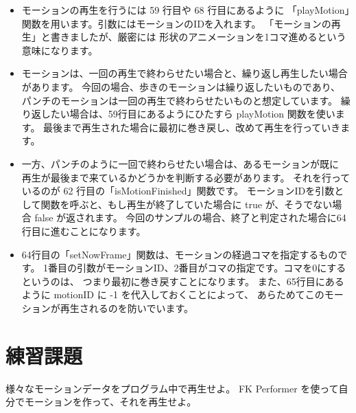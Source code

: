 \begin{itemize}
 \item モーションの再生を行うには 59 行目や 68 行目にあるように
	「playMotion」関数を用います。引数にはモーションのIDを入れます。
	「モーションの再生」と書きましたが、厳密には
	形状のアニメーションを1コマ進めるという意味になります。

 \item モーションは、一回の再生で終わらせたい場合と、繰り返し再生したい場合があります。
	今回の場合、歩きのモーションは繰り返したいものであり、
	パンチのモーションは一回の再生で終わらせたいものと想定しています。
	繰り返したい場合は、59行目にあるようにひたすら playMotion 関数を使います。
	最後まで再生された場合に最初に巻き戻し、改めて再生を行っていきます。

 \item 一方、パンチのように一回で終わらせたい場合は、あるモーションが既に
	再生が最後まで来ているかどうかを判断する必要があります。
	それを行っているのが 62 行目の「isMotionFinished」関数です。
	モーションIDを引数として関数を呼ぶと、もし再生が終了していた場合に
	true が、そうでない場合 false が返されます。
	今回のサンプルの場合、終了と判定された場合に64 行目に進むことになります。

 \item 64行目の「setNowFrame」関数は、モーションの経過コマを指定するものです。
	1番目の引数がモーションID、2番目がコマの指定です。コマを0にするというのは、
	つまり最初に巻き戻すことになります。
	また、65行目にあるように motionID に -1 を代入しておくことによって、
	あらためてこのモーションが再生されるのを防いでいます。
\end{itemize}
\section{練習課題} \label{sec:09-q}
\begin{description}
 \myitem 様々なモーションデータをプログラム中で再生せよ。
 \myitem FK Performer を使って自分でモーションを作って、それを再生せよ。
\end{description}
